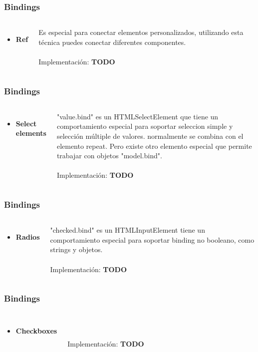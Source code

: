 \documentclass{beamer}
\begin{document}
\begin{frame}
\frametitle{Bindings}
\begin{columns}[c]
\begin{itemize}
\item \textbf{Ref}
\end{itemize}
Es especial para conectar elementos personalizados, utilizando esta t\'ecnica puedes conectar diferentes componentes.
\\~\\
Implementaci\'on: \textbf{TODO}
\end{columns}
\end{frame}
\begin{frame}
\frametitle{Bindings}
\begin{columns}[c]
\begin{itemize}
\item \textbf{Select elements}
\end{itemize}
"value.bind" es un HTMLSelectElement que tiene un comportamiento especial para soportar seleccion simple y selecci\'on m\'ultiple de valores. normalmente se combina con el elemento repeat. Pero existe otro elemento especial que permite trabajar con objetos "model.bind".
\\~\\
Implementaci\'on: \textbf{TODO}
\end{columns}
\end{frame}
\begin{frame}
\frametitle{Bindings}
\begin{columns}[c]
\begin{itemize}
\item \textbf{Radios}
\end{itemize}
"checked.bind" es un HTMLInputElement tiene un comportamiento especial para soportar binding no booleano, como strings y objetos.
\\~\\
Implementaci\'on: \textbf{TODO}
\end{columns}
\end{frame}
\begin{frame}
\frametitle{Bindings}
\begin{columns}[c]
\begin{itemize}
\item \textbf{Checkboxes}
\end{itemize}
\\~\\
Implementaci\'on: \textbf{TODO}
\end{columns}
\end{frame}
\end{document}
